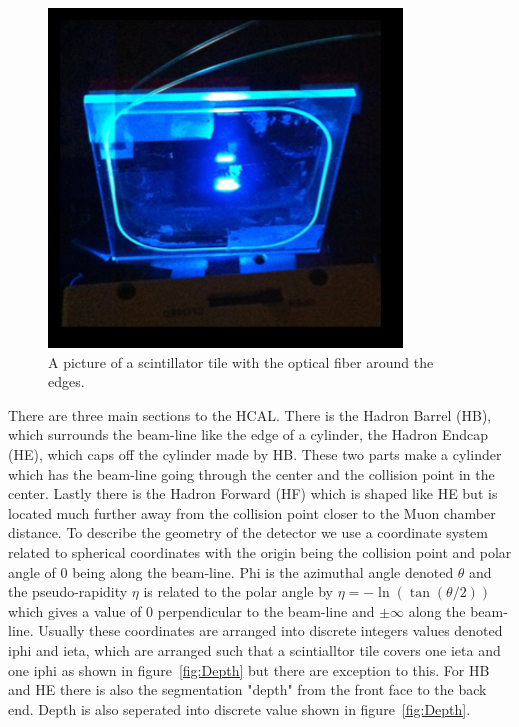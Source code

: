 \begin{figure}
\centering
\includegraphics[width=0.6\linewidth]{Figures/Tile.png}
\caption{A picture of a scintillator tile with the optical fiber around the edges.}
\label{fig:Tile}
\end{figure}

There are three main sections to the HCAL. There is the Hadron Barrel (HB), which surrounds the beam-line like the edge of a cylinder, the Hadron Endcap (HE), which caps off the cylinder made by HB. These two parts make a cylinder which has the beam-line going through the center and the collision point in the center. Lastly there is the Hadron Forward (HF) which is shaped like HE but is located much further away from the collision point closer to the Muon chamber distance. To describe the geometry of the detector we use a coordinate system related to spherical coordinates with the origin being the collision point and polar angle of 0 being along the beam-line. Phi is the azimuthal angle denoted $\theta$ and the pseudo-rapidity $\eta$ is related to the polar angle by $\eta = -\ln(\tan(\theta/2))$ which gives a value of 0 perpendicular to the beam-line and $\pm\infty$ along the beam-line. Usually these coordinates are arranged into discrete integers values denoted iphi and ieta, which are arranged such that a scintialltor tile covers one ieta and one iphi as shown in figure~\ref{fig:Depth} but there are exception to this. For HB and HE there is also the segmentation "depth" from the front face to the back end. Depth is also seperated into discrete value shown in figure~\ref{fig:Depth}.

